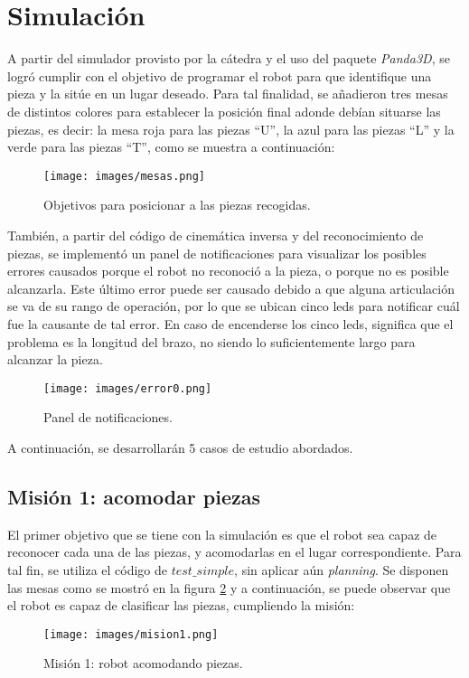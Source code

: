 \section{Simulación}
A partir del simulador provisto por la cátedra y el uso del paquete \textit{Panda3D}, se logró cumplir con el objetivo de programar el robot para que identifique una pieza y la sitúe en un lugar deseado. Para tal finalidad, se añadieron tres mesas de distintos colores para establecer la posición final adonde debían situarse las piezas, es decir: la mesa roja para las piezas ``U'', la azul para las piezas ``L'' y la verde para las piezas ``T'', como se muestra a continuación:
\begin{figure}[h!]
	\centering
	\texttt{[image: images/mesas.png]}
	\caption{Objetivos para posicionar a las piezas recogidas.}
	\label{fig:mesas}
\end{figure}

También, a partir del código de cinemática inversa y del reconocimiento de piezas, se implementó un panel de notificaciones para visualizar los posibles errores causados porque el robot no reconoció a la pieza, o porque no es posible alcanzarla. Este último error puede ser causado debido a que alguna articulación se va de su rango de operación, por lo que se ubican cinco leds para notificar cuál fue la causante de tal error. En caso de encenderse los cinco leds, significa que el problema es la longitud del brazo, no siendo lo suficientemente largo para alcanzar la pieza.

\begin{figure}[h!]
	\centering
	\texttt{[image: images/error0.png]}
	\caption{Panel de notificaciones.}
	\label{fig:mesas}
\end{figure}

A continuación, se desarrollarán 5 casos de estudio abordados.

\subsection{Misión 1: acomodar piezas}
El primer objetivo que se tiene con la simulación es que el robot sea capaz de reconocer cada una de las piezas, y acomodarlas en el lugar correspondiente. Para tal fin, se utiliza el código de \textit{$test\_simple$}, sin aplicar aún \textit{planning}. Se disponen las mesas como se mostró en la figura \ref{fig:mesas} y a continuación, se puede observar que el robot es capaz de clasificar las piezas, cumpliendo la misión:
\begin{figure}[h!]
	\centering
	\texttt{[image: images/mision1.png]}
	\caption{Misión 1: robot acomodando piezas.}
	\label{fig:M1}
\end{figure}

